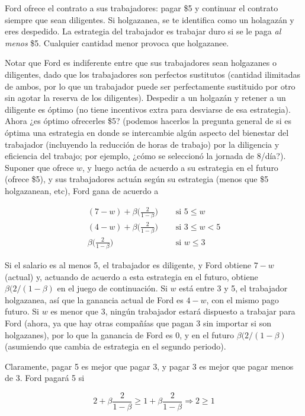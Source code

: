 \documentclass[12pt]{scrartcl}
\begin{document}
Ford ofrece el contrato a sus trabajadores: pagar \$5 y continuar el contrato siempre que sean diligentes. Si holgazanea, se te identifica como un holagazán y eres despedido. La estrategia del trabajador es trabajar duro si se le paga \textit{al menos} \$5. Cualquier cantidad menor provoca que holgazanee.

Notar que Ford es indiferente entre que sus trabajadores sean holgazanes o diligentes, dado que los trabajadores son perfectos sustitutos (cantidad ilimitadas de ambos, por lo que un trabajador puede ser perfectamente sustituido por otro sin agotar la reserva de los diligentes). Despedir a un holgazán y retener a un diligente es óptimo (no tiene incentivos extra para desviarse de esa estrategia). Ahora ¿es óptimo ofrecerles \$5? (podemos hacerlos la pregunta general de si es óptima una estrategia en donde se intercambie algún aspecto del bienestar del trabajador (incluyendo la reducción de horas de trabajo) por la diligencia y eficiencia del trabajo; por ejemplo, ¿cómo se seleccionó la jornada de 8/día?). Suponer que ofrece $w$, y luego actúa de acuerdo a su estrategia en el futuro (ofrece \$5), y sus trabajadores actuán según su estrategia (menos que \$5 holgazanean, etc), Ford gana de acuerdo a

\begin{align*}
	(7-w) + \beta\Bigg (\frac{2}{1-\beta} \Bigg )\quad & \text{ si } 5 \leq w     \\
	(4-w)+\beta\Bigg (\frac{2}{1-\beta} \Bigg )\quad   & \text{ si } 3 \leq w < 5 \\
	\beta\Bigg (\frac{2}{1-\beta} \Bigg )\quad         & \text{ si } w \leq 3     
\end{align*}

Si el salario es al menos 5, el trabajador es diligente, y Ford obtiene $7-w$ (actual) y, actuando de acuerdo a esta estrategia en el futuro, obtiene $\beta (2 / (1-\beta)$ en el juego de continuación. Si $w$ está entre 3 y 5, el trabajador holgazanea, así que la ganancia actual de Ford es $4-w$, con el mismo pago futuro. Si $w$ es menor que 3, ningún trabajador estará dispuesto a trabajar para Ford (ahora, ya que hay otras compañías que pagan 3 sin importar si son holgazanes), por lo que la ganancia de Ford es 0, y en el futuro $\beta (2 / (1-\beta)$ (asumiendo que cambia de estrategia en el segundo periodo). 

Claramente, pagar 5 es mejor que pagar 3, y pagar 3 es mejor que pagar menos de 3. Ford pagará 5 si

\[ 
    2 + \beta\frac{2}{1-\beta} \geq 1 + \beta\frac{2}{1-\beta} \Longrightarrow 2\geq 1
\]
\end{document}
